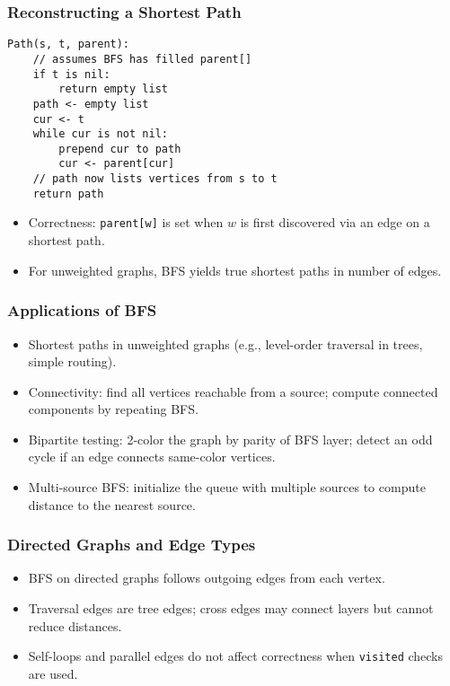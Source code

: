 \documentclass{beamer}
\begin{document}
\begin{frame}[fragile]
\frametitle{Reconstructing a Shortest Path}
\begin{lstlisting}[language={},escapechar=!]
Path(s, t, parent):
    // assumes BFS has filled parent[]
    if t is nil:
        return empty list
    path <- empty list
    cur <- t
    while cur is not nil:
        prepend cur to path
        cur <- parent[cur]
    // path now lists vertices from s to t
    return path
\end{lstlisting}
\begin{itemize}
    \item Correctness: \texttt{parent[w]} is set when $w$ is first discovered via an edge on a shortest path.
    \item For unweighted graphs, BFS yields true shortest paths in number of edges.
\end{itemize}
\end{frame}

\begin{frame}
\frametitle{Applications of BFS}
\begin{itemize}
    \item Shortest paths in unweighted graphs (e.g., level-order traversal in trees, simple routing).
    \item Connectivity: find all vertices reachable from a source; compute connected components by repeating BFS.
    \item Bipartite testing: 2-color the graph by parity of BFS layer; detect an odd cycle if an edge connects same-color vertices.
    \item Multi-source BFS: initialize the queue with multiple sources to compute distance to the nearest source.
\end{itemize}
\end{frame}

\begin{frame}
\frametitle{Directed Graphs and Edge Types}
\begin{itemize}
    \item BFS on directed graphs follows outgoing edges from each vertex.
    \item Traversal edges are tree edges; cross edges may connect layers but cannot reduce distances.
    \item Self-loops and parallel edges do not affect correctness when \texttt{visited} checks are used.
\end{itemize}
\end{frame}
\end{document}
